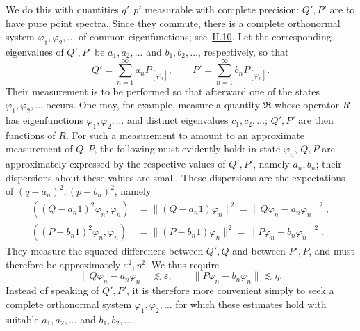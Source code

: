 \documentclass[fontsize=13pt,twoside,openany,headings=normal,parskip=false,bookmarkpackage=false,DIV=calc]{scrbook}
\begin{document}
We do this with quantities $q',p'$ measurable with complete precision: $Q',P'$ are to have pure point spectra. Since they commute, there is a complete orthonormal system $\varphi_1,\varphi_2,\ldots$ of common eigenfunctions; see~\hyperref[sec:II.10]{II.10}. Let the corresponding eigenvalues of $Q',P'$ be $a_1,a_2,\ldots$ and $b_1,b_2,\ldots$, respectively, so that
\[
Q'=\sum_{n=1}^{\infty}a_nP_{[\varphi_n]},\qquad
P'=\sum_{n=1}^{\infty}b_nP_{[\varphi_n]}.
\]
Their measurement is to be performed so that afterward one of the states $\varphi_1,\varphi_2,\ldots$ occurs. One may, for example, measure a quantity $\mathfrak R$ whose operator $R$ has eigenfunctions $\varphi_1,\varphi_2,\ldots$ and distinct eigenvalues $c_1,c_2,\ldots$; $Q',P'$ are then functions of $R$. For such a measurement to amount to an approximate measurement of $Q,P$, the following must evidently hold: in state $\varphi_n$, $Q,P$ are approximately expressed by the respective values of $Q',P'$, namely $a_n,b_n$; their dispersions about these values are small. These dispersions are the expectations of $(q-a_n)^2,(p-b_n)^2$, namely
\begin{align*}
((Q-a_n1)^2\varphi_n,\varphi_n)&=\|(Q-a_n1)\varphi_n\|^2=\|Q\varphi_n-a_n\varphi_n\|^2,\\
((P-b_n1)^2\varphi_n,\varphi_n)&=\|(P-b_n1)\varphi_n\|^2=\|P\varphi_n-b_n\varphi_n\|^2.
\end{align*}
They measure the squared differences between $Q',Q$ and between $P',P$, and must therefore be approximately $\varepsilon^2,\eta^2$. We thus require
\[
\|Q\varphi_n-a_n\varphi_n\|\lesssim\varepsilon,\qquad
\|P\varphi_n-b_n\varphi_n\|\lesssim\eta.
\]
Instead of speaking of $Q',P'$, it is therefore more convenient simply to seek a complete orthonormal system $\varphi_1,\varphi_2,\ldots$ for which these estimates hold with suitable $a_1,a_2,\ldots$ and $b_1,b_2,\ldots$.
\end{document}
